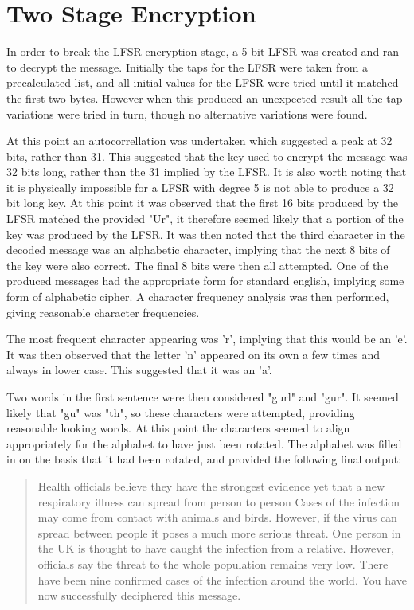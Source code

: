 \section{Two Stage Encryption}

In order to break the LFSR encryption stage, a 5 bit LFSR was created and ran to decrypt the message.
Initially the taps for the LFSR were taken from a precalculated list, and all initial values for the LFSR were tried until it matched the first two bytes.
However when this produced an unexpected result all the tap variations were tried in turn, though no alternative variations were found.

At this point an autocorrellation was undertaken which suggested a peak at 32 bits, rather than 31.
This suggested that the key used to encrypt the message was 32 bits long, rather than the 31 implied by the LFSR.
It is also worth noting that it is physically impossible for a LFSR with degree 5 is not able to produce a 32 bit long key.
At this point it was observed that the first 16 bits produced by the LFSR matched the provided "Ur", it therefore seemed likely that a portion of the key was produced by the LFSR.
It was then noted that the third character in the decoded message was an alphabetic character, implying that the next 8 bits of the key were also correct.
The final 8 bits were then all attempted.
One of the produced messages had the appropriate form for standard english, implying some form of alphabetic cipher.
A character frequency analysis was then performed, giving reasonable character frequencies.

The most frequent character appearing was 'r', implying that this would be an 'e'.
It was then observed that the letter 'n' appeared on its own a few times and always in lower case.
This suggested that it was an 'a'.

Two words in the first sentence were then considered "gurl" and "gur".
It seemed likely that "gu" was "th", so these characters were attempted, providing reasonable looking words.
At this point the characters seemed to align appropriately for the alphabet to have just been rotated.
The alphabet was filled in on the basis that it had been rotated, and provided the following final output:

\begin{quote}
Health officials believe they have the strongest evidence yet that a new respiratory illness can spread from person to person Cases of the infection may come from contact with animals and birds. However, if the virus can spread between people it poses a much more serious threat. One person in the UK is thought to have caught the infection from a relative. However, officials say the threat to the whole population remains very low. There have been nine confirmed cases of the infection around the world. You have now successfully deciphered this message.
\end{quote}

